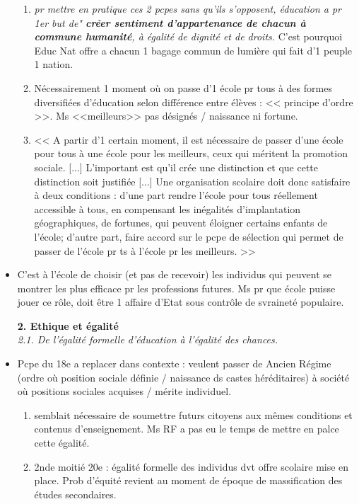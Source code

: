 \documentclass[12pt]{report}
\begin{document}
\begin{itemize}
{\begin{minipage}{19cm}
\begin{enumerate}
\item \textit{pr mettre en pratique ces 2 pcpes sans qu'ils s'opposent, éducation a pr 1er but de" \textbf{créer sentiment d'appartenance de chacun à commune humanité}, à égalité de dignité et de droits.} C'est pourquoi Educ Nat offre a chacun 1 bagage commun de lumière qui fait d'1 peuple 1 nation.\\
\item Nécessairement 1 moment où on passe d'1 école pr tous à des formes diversifiées d'éducation selon différence entre élèves : << principe d'ordre >>. Ms <<meilleurs>> pas désignés / naissance ni fortune.  \\
\item << A partir d'1 certain moment, il est nécessaire de passer d'une école pour tous à une école pour les meilleurs, ceux qui méritent la promotion sociale. [...] L'important est qu'il crée une distinction et que cette distinction soit justifiée [...] Une organisation scolaire doit donc satisfaire à deux conditions : d'une part rendre l'école pour tous réellement accessible à tous, en compensant les inégalités d'implantation géographiques, de fortunes, qui peuvent éloigner certains enfants de l'école; d'autre part, faire accord sur le pcpe de sélection qui permet de passer de l'école pr ts à l'école pr les meilleurs. >>
\end{enumerate}

\end{minipage}
}


\vspace{0.5cm}

\item C'est à l'école de choisir (et pas de recevoir) les individus qui peuvent se montrer les plus efficace pr les professions futures. Ms pr que école puisse jouer ce rôle, doit être 1 affaire d'Etat sous contrôle de svraineté populaire.

\textbf{2. Ethique et égalité} \\

\textit{2.1. De l'égalité formelle d'éducation à l'égalité des chances.} \\

\item Pcpe du 18e a replacer dans contexte : veulent passer de Ancien Régime (ordre où position sociale définie / naissance ds castes héréditaires) à société où positions sociales acquises / mérite individuel.\\
\begin{enumerate}
\item semblait nécessaire de soumettre futurs citoyens aux mêmes conditions et contenus d'enseignement. Ms RF a pas eu le temps de mettre en palce cette égalité. \\
\item 2nde moitié 20e : égalité formelle des individus dvt offre scolaire mise en place. Prob d'équité revient au moment de époque de massification des études secondaires.\\
\end{enumerate}


\end{itemize}
\end{document}
